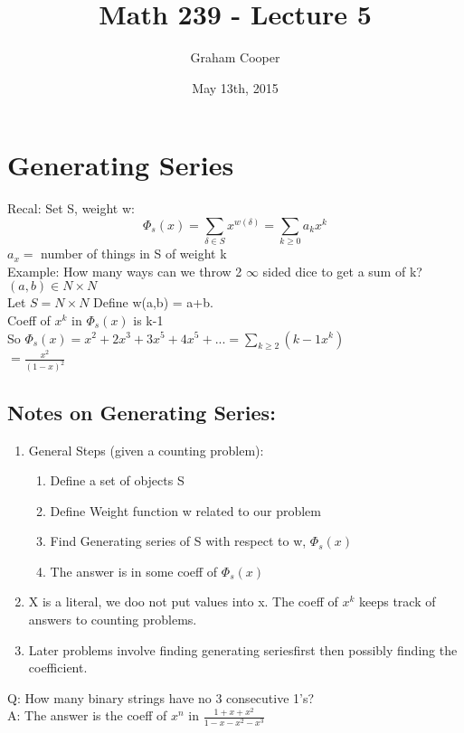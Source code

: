 \documentclass[12pt]{article}
\title{\vspace{-15ex}Math 239 - Lecture 5\vspace{-1ex}}
\date{May 13th, 2015}
\author{Graham Cooper}
\begin{document}
	\maketitle
	\section*{Generating Series}
	Recal: Set S, weight w:
	$$\Phi_s(x) = \sum_{\delta \in S}x^{w(\delta)} = \sum_{k \geq 0}a_kx^k$$
	$a_x = $ number of things in S of weight k\\
	
	Example: How many ways can we throw 2 $\infty$ sided dice to get a sum of k?\\
	$(a,b) \in N \times N$\\
	Let $S = N \times N$ Define w(a,b) = a+b. \\
	Coeff of $x^k$ in $\Phi_s(x)$ is k-1\\
	So $\Phi_s(x) = x^2 + 2x^3 + 3x^5 + 4x^5 + ... = \sum_{k \geq 2}(k-1x^k)$\\
	$ = \frac{x^2}{(1-x)^2}$\\
	
	\subsection*{Notes on Generating Series:}
	\begin{enumerate}
		\item General Steps (given a counting problem):
		\begin{enumerate}
			\item Define a set of objects S
			\item Define Weight function w related to our problem
			\item Find Generating series of S with respect to w, $\Phi_s(x)$
			\item The answer is in some coeff of $\Phi_s(x)$
		\end{enumerate}
		\item X is a literal, we doo not put values into x. The coeff of $x^k$ keeps track of answers to counting problems.
		\item Later problems involve finding generating seriesfirst then possibly finding the coefficient.
	\end{enumerate}
	
	Q: How many binary strings have no 3 consecutive 1's?\\
	A: The answer is the coeff of $x^n$ in $\frac{1+x+x^2}{1-x-x^2-x^3}$\\
	
\end{document}
